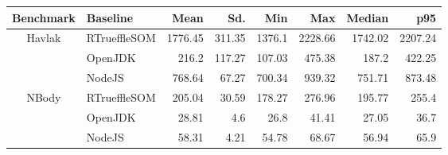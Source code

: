 \begin{center}
\begin{tabular}{ c | l r r r r r r}
\toprule
\textbf{Benchmark} & \textbf{Baseline} & \textbf{Mean} & \textbf{Sd.} & \textbf{Min} & \textbf{Max} & \textbf{Median} & \textbf{p95}\\
\toprule

\multirow{3}{*}{ Havlak } & RTrueffleSOM & 1776.45 & 311.35 & 1376.1 & 2228.66 & 1742.02 & 2207.24 \\
& OpenJDK & 216.2 & 117.27 & 107.03 & 475.38 & 187.2 & 422.25 \\
& NodeJS & 768.64 & 67.27 & 700.34 & 939.32 & 751.71 & 873.48 \\
\midrule

\multirow{3}{*}{ NBody } & RTrueffleSOM & 205.04 & 30.59 & 178.27 & 276.96 & 195.77 & 255.4 \\
& OpenJDK & 28.81 & 4.6 & 26.8 & 41.41 & 27.05 & 36.7 \\
& NodeJS & 58.31 & 4.21 & 54.78 & 68.67 & 56.94 & 65.9 \\
\midrule

\end{tabular}
\end{center}